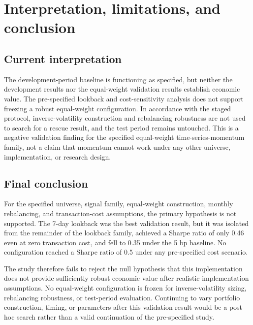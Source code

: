 \documentclass[11pt,a4paper]{article}
\begin{document}
\FloatBarrier

\section{Interpretation, limitations, and conclusion}
\subsection{Current interpretation}
The development-period baseline is functioning as specified, but neither the development results nor the equal-weight validation results establish economic value. The pre-specified lookback and cost-sensitivity analysis does not support freezing a robust equal-weight configuration. In accordance with the staged protocol, inverse-volatility construction and rebalancing robustness are not used to search for a rescue result, and the test period remains untouched. This is a negative validation finding for the specified equal-weight time-series-momentum family, not a claim that momentum cannot work under any other universe, implementation, or research design.

\subsection{Final conclusion}

For the specified universe, signal family, equal-weight construction, monthly rebalancing, and transaction-cost assumptions, the primary hypothesis is not supported. The 7-day lookback was the best validation result, but it was isolated from the remainder of the lookback family, achieved a Sharpe ratio of only 0.46 even at zero transaction cost, and fell to 0.35 under the 5 bp baseline. No configuration reached a Sharpe ratio of 0.5 under any pre-specified cost scenario.

The study therefore fails to reject the null hypothesis that this implementation does not provide sufficiently robust economic value after realistic implementation assumptions. No equal-weight configuration is frozen for inverse-volatility sizing, rebalancing robustness, or test-period evaluation. Continuing to vary portfolio construction, timing, or parameters after this validation result would be a post-hoc search rather than a valid continuation of the pre-specified study.


\end{document}
